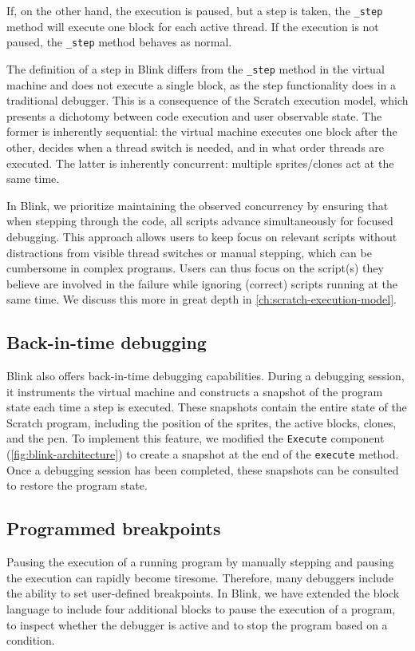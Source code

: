 \documentclass[../main]{subfiles}
\begin{document}
If, on the other hand, the execution is paused, but a step is taken, the \texttt{\_step} method will execute one block for each active thread.
If the execution is not paused, the \texttt{\_step} method behaves as normal.

The definition of a step in Blink differs from the \texttt{\_step} method in the virtual machine and does not execute a single block, as the step functionality does in a traditional debugger.
This is a consequence of the Scratch execution model, which presents a dichotomy between code execution and user observable state.
The former is inherently sequential: the virtual machine executes one block after the other, decides when a thread switch is needed, and in what order threads are executed.
The latter is inherently concurrent: multiple sprites/clones act at the same time.

In Blink, we prioritize maintaining the observed concurrency by ensuring that when stepping through the code, all scripts advance simultaneously for focused debugging.
This approach allows users to keep focus on relevant scripts without distractions from visible thread switches or manual stepping, which can be cumbersome in complex programs.
Users can thus focus on the script(s) they believe are involved in the failure while ignoring (correct) scripts running at the same time.
We discuss this more in great depth in \cref{ch:scratch-execution-model}.

\subsection{Back-in-time debugging}\label{subsec:arch-back-in-time-debugging}
Blink also offers back-in-time debugging capabilities.
During a debugging session, it instruments the virtual machine and constructs a snapshot of the program state each time a step is executed.
These snapshots contain the entire state of the Scratch program, including the position of the sprites, the active blocks, clones, and the pen.
To implement this feature, we modified the \texttt{Execute} component (\cref{fig:blink-architecture}) to create a snapshot at the end of the \texttt{execute} method.
Once a debugging session has been completed, these snapshots can be consulted to restore the program state.

\subsection{Programmed breakpoints}\label{subsec:arch-programmed-breakpoints}
Pausing the execution of a running program by manually stepping and pausing the execution can rapidly become tiresome.
Therefore, many debuggers include the ability to set user-defined breakpoints.
In Blink, we have extended the block language to include four additional blocks to pause the execution of a program, to inspect whether the debugger is active and to stop the program based on a condition.
\end{document}
